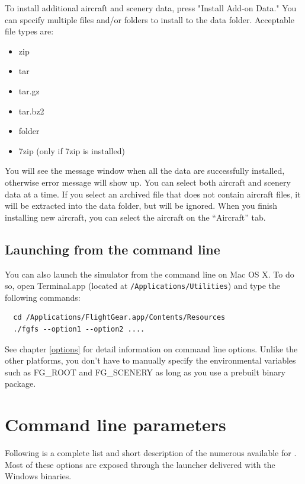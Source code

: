 To install additional aircraft and scenery data, press "Install Add-on Data." You can specify multiple files and/or folders to install to the \FlightGear{} data folder. Acceptable file types are:
\begin{itemize}
\item zip
\item tar
\item tar.gz
\item tar.bz2
\item folder
\item 7zip (only if 7zip is installed)
\end{itemize}

You will see the message window when all the data are successfully installed, otherwise error message will show up. You can select both aircraft and scenery data at a time. If you select an archived file that does not contain aircraft files, it will be extracted into the data folder, but will be ignored. When you finish installing new aircraft, you can select the aircraft on the ``Aircraft'' tab.

\subsection{Launching from the command line}
You can also launch the simulator from the command line on Mac OS X. To do so, open Terminal.app (located at \texttt{/Applications/Utilities}) and type the following commands:
\begin{verbatim}
  cd /Applications/FlightGear.app/Contents/Resources
  ./fgfs --option1 --option2 ....
\end{verbatim}

See chapter \ref{options} for detail information on command line options. Unlike the other platforms, you don't have to manually specify the environmental variables such as FG\_ROOT and FG\_SCENERY as long as you use a prebuilt binary package. 

\section{Command line parameters\label{options}}
Following is a complete list and short description of the numerous 
available for \FlightGear{}. Most of these options are exposed through the \FlightGear{} launcher delivered with the
Windows binaries.

